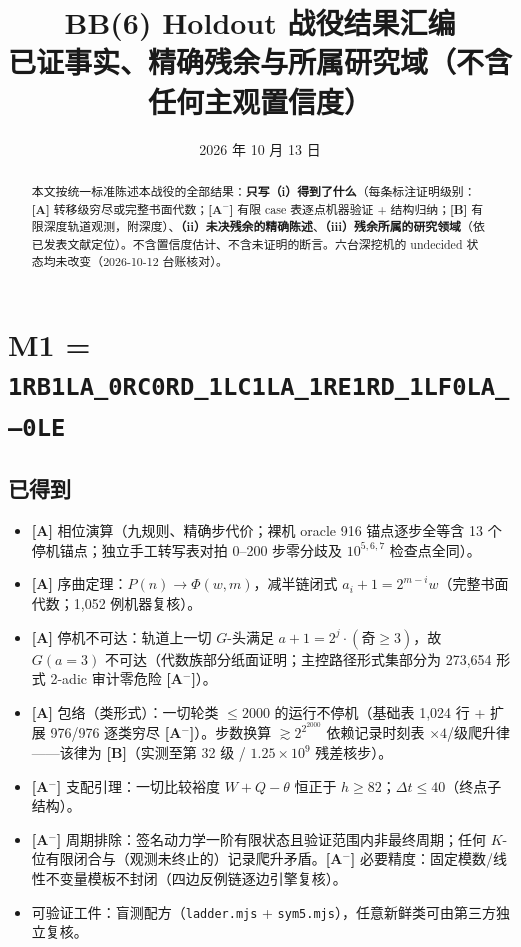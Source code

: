 \documentclass[11pt]{ctexart}
\title{\bfseries BB(6) Holdout 战役结果汇编\\ \large 已证事实、精确残余与所属研究域（不含任何主观置信度）}
\author{}
\date{2026 年 10 月 13 日}
\newcommand{\grA}{\textbf{[A]}}
\newcommand{\grAm}{\textbf{[A$^-$]}}
\newcommand{\grB}{\textbf{[B]}}
\begin{document}
\maketitle

\begin{abstract}
本文按统一标准陈述本战役的全部结果：\textbf{只写（i）得到了什么}（每条标注证明级别：\grA{} 转移级穷尽或完整书面代数；\grAm{} 有限 case 表逐点机器验证 + 结构归纳；\grB{} 有限深度轨道观测，附深度）、\textbf{（ii）未决残余的精确陈述}、\textbf{（iii）残余所属的研究领域}（依已发表文献定位）。不含置信度估计、不含未证明的断言。六台深挖机的 undecided 状态均未改变（2026-10-12 台账核对）。
\end{abstract}

\section{M1 = \texttt{1RB1LA\_0RC0RD\_1LC1LA\_1RE1RD\_1LF0LA\_---0LE}}

\subsection{已得到}
\begin{itemize}
\item \grA{} 相位演算（九规则、精确步代价；裸机 oracle 916 锚点逐步全等含 13 个停机锚点；独立手工转写表对拍 0--200 步零分歧及 $10^{5,6,7}$ 检查点全同）。
\item \grA{} 序曲定理：$P(n)\to\Phi(w,m)$，减半链闭式 $a_i+1=2^{m-i}w$（完整书面代数；1,052 例机器复核）。
\item \grA{} 停机不可达：轨道上一切 $G$-头满足 $a+1=2^{j}\cdot(\text{奇}\ge3)$，故 $G(a{=}3)$ 不可达（代数族部分纸面证明；主控路径形式集部分为 273,654 形式 2-adic 审计零危险 \grAm{}）。
\item \grA{} 包络（类形式）：一切轮类 $\le2000$ 的运行不停机（基础表 1,024 行 + 扩展 976/976 逐类穷尽 \grAm{}）。步数换算 $\gtrsim2^{2^{2000}}$ 依赖记录时刻表 $\times4$/级爬升律——该律为 \grB{}（实测至第 32 级 / $1.25\times10^9$ 残差核步）。
\item \grAm{} 支配引理：一切比较裕度 $W+Q-\theta$ 恒正于 $h\ge82$；$\Delta t\le40$（终点子结构）。
\item \grAm{} 周期排除：签名动力学一阶有限状态且验证范围内非最终周期；任何 $K$-位有限闭合与（观测未终止的）记录爬升矛盾。\grAm{} 必要精度：固定模数/线性不变量模板不封闭（四边反例链逐边引擎复核）。
\item 可验证工件：盲测配方（\texttt{ladder.mjs} + \texttt{sym5.mjs}），任意新鲜类可由第三方独立复核。
\end{itemize}
\end{document}
